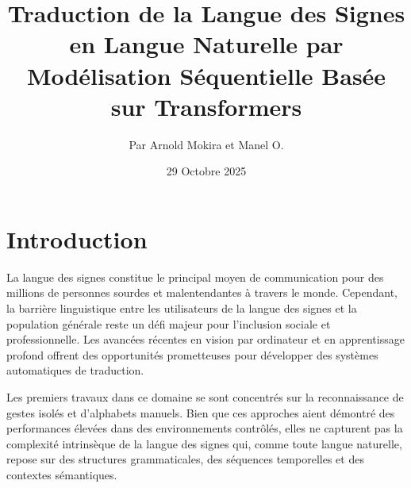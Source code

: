 \documentclass[twocolumn]{el-author}
\date{29 Octobre 2025}
\begin{document}
\title{Traduction de la Langue des Signes en Langue Naturelle par Modélisation Séquentielle Basée sur Transformers}

\author{Par Arnold Mokira et Manel O.}


\maketitle

\section{Introduction}

La langue des signes constitue le principal moyen de communication pour des millions de personnes sourdes et malentendantes à travers le monde. Cependant, la barrière linguistique entre les utilisateurs de la langue des signes et la population générale reste un défi majeur pour l'inclusion sociale et professionnelle. Les avancées récentes en vision par ordinateur et en apprentissage profond offrent des opportunités prometteuses pour développer des systèmes automatiques de traduction.

Les premiers travaux dans ce domaine se sont concentrés sur la reconnaissance de gestes isolés et d'alphabets manuels. Bien que ces approches aient démontré des performances élevées dans des environnements contrôlés, elles ne capturent pas la complexité intrinsèque de la langue des signes qui, comme toute langue naturelle, repose sur des structures grammaticales, des séquences temporelles et des contextes sémantiques.
\end{document}
